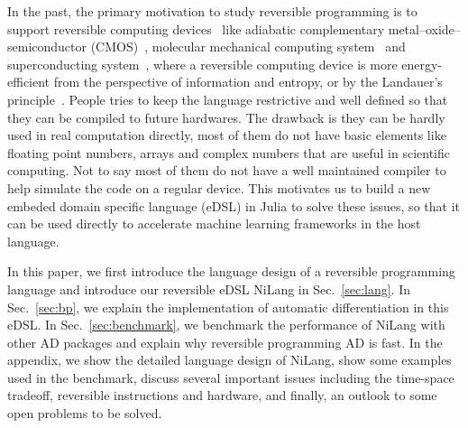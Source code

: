 \documentclass{article}
\newcommand{\<}{\langle}
\renewcommand{\>}{\rangle}
\newcommand{\Sec}[1]{Sec.~\ref{#1}}
\theoremstyle{definition}\newtheorem{definition}{\textit{Definition}}
\begin{document}
    In the past, the primary motivation to study reversible programming is to support reversible computing devices~\cite{Frank1999} like adiabatic complementary metal–oxide–semiconductor (CMOS)~\cite{Koller1992}, molecular mechanical computing system~\cite{Merkle2018} and superconducting system~\cite{Likharev1977,Semenov2003}, where a reversible computing device is more energy-efficient from the perspective of information and entropy, or by the Landauer's principle~\cite{Landauer1961}.
    People tries to keep the language restrictive and well defined so that they can be compiled to future hardwares. The drawback is they can be hardly used in real computation directly, most of them do not have basic elements like floating point numbers, arrays and complex numbers that are useful in scientific computing. Not to say most of them do not have a well maintained compiler to help simulate the code on a regular device. This motivates us to build a new embeded domain specific language (eDSL) in Julia to solve these issues, so that it can be used directly to accelerate machine learning frameworks in the host language.

    In this paper, we first introduce the language design of a reversible programming language and introduce our reversible eDSL NiLang in \Sec{sec:lang}.
    In \Sec{sec:bp}, we explain the implementation of automatic differentiation in this eDSL.
    In \Sec{sec:benchmark}, we benchmark the performance of NiLang with other AD packages and explain why reversible programming AD is fast.
    In the appendix, we show the detailed language design of NiLang, show some examples used in the benchmark, discuss several important issues including the time-space  tradeoff, reversible instructions and hardware, and finally, an outlook to some open problems to be solved.
\end{document}
